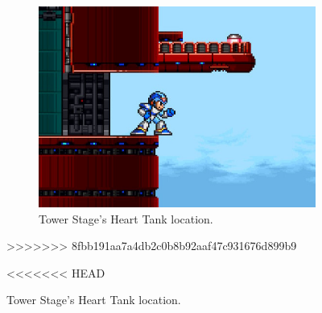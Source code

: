 \begin{figure}[htp]
\begin{figure}[htp]
	\centering
	\includegraphics[width=0.5\linewidth]{figures/X1/Tower_heart.jpg}
	\caption{Tower Stage's Heart Tank location.}
\end{figure}

>>>>>>> 8fbb191aa7a4db2c0b8b92aaf47c931676d899b9


<<<<<<< HEAD

\end{figure}
